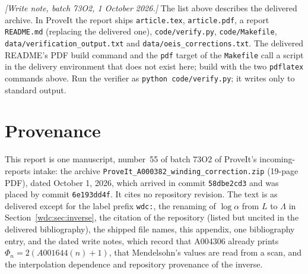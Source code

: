 \documentclass[11pt,letterpaper]{article}
\newcommand{\file}[1]{\nolinkurl{#1}}
\numberwithin{equation}{section}
\theoremstyle{definition}
\begin{document}
\emph{[Write note, batch 73O2, 1 October 2026.]} The list above describes
the delivered archive. In ProveIt the report ships \file{article.tex},
\texttt{article.pdf}, a report \file{README.md} (replacing the delivered
one), \file{code/verify.py}, \file{code/Makefile},
\file{data/verification_output.txt} and
\file{data/oeis_corrections.txt}. The delivered README's PDF build
command and the \texttt{pdf} target of the \texttt{Makefile} call a script
in the delivery environment that does not exist here; build with the two
\texttt{pdflatex} commands above. Run the verifier as
\texttt{python code/verify.py}; it writes only to standard output.

\section{Provenance}\label{wdc:sec:provenance}
This report is one manuscript, number~55 of batch 73O2 of ProveIt's
incoming-reports intake: the archive
\texttt{ProveIt\_A000382\_winding\_correction.zip} (19-page PDF), dated
October 1, 2026, which arrived in commit \texttt{58dbe2cd3} and was placed by
commit \texttt{6e193dd4f}. It cites no repository revision. The text is as
delivered except for the label prefix \texttt{wdc:}, the renaming of
$\log\alpha$ from $L$ to $\Lambda$ in Section~\ref{wdc:sec:inverse}, the
citation of the repository (listed but uncited in the delivered
bibliography), the shipped file names, this appendix, one bibliography
entry, and the dated write notes, which record that A004306 already prints
$\Phi_n=2(A001644(n)+1)$, that Mendelsohn's values are read from a scan, and
the interpolation dependence and repository provenance of the inverse.
\end{document}
